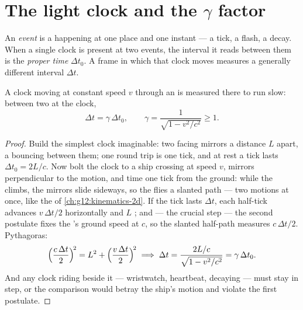 \section{The light clock and the $\gamma$ factor}

\begin{definition}\label{def:g12:special-relativity:proper-time}
An \emph{event} is a happening at one place and one instant
--- a tick, a flash, a decay. When a single clock is present at two events,
the interval it reads between them is the
\emph{proper time} $\Delta t_0$. A frame in which that
clock moves measures a generally different interval $\Delta t$.
\end{definition}

\begin{theorem}\label{thm:g12:special-relativity:dilation}
A clock moving at constant speed $v$ through an  is measured
there to run slow: between two  at the clock,
\[
\Delta t = \gamma\, \Delta t_0, \qquad
\gamma = \frac{1}{\sqrt{1 - v^2/c^2}} \geq 1 .
\]
\end{theorem}

\begin{proof}
Build the simplest clock imaginable: two facing mirrors a distance $L$
apart, a  bouncing between them; one round trip is one tick, and at
rest a tick lasts $\Delta t_0 = 2L/c$. Now bolt the clock to a ship
crossing at speed $v$, mirrors perpendicular to the motion, and time one
tick from the ground: while the  climbs, the mirrors slide sideways,
so the  flies a slanted path --- two motions at once, like the
 of \cref{ch:g12:kinematics-2d}. If the tick lasts $\Delta t$,
each half-tick advances $v\,\Delta t/2$ horizontally and $L$ ; and ---
the crucial step --- the second postulate fixes the 's ground speed at
$c$, so the slanted half-path measures $c\,\Delta t/2$. Pythagoras:
\[
\Bigl(\frac{c\,\Delta t}{2}\Bigr)^{\!2} = L^2 + \Bigl(\frac{v\,\Delta t}{2}\Bigr)^{\!2}
\;\Longrightarrow\;
\Delta t = \frac{2L/c}{\sqrt{1 - v^2/c^2}} = \gamma\,\Delta t_0 .
\]
And any clock riding beside it --- wristwatch, heartbeat, decaying  ---
must stay in step, or the comparison would betray the ship's motion and violate
the first postulate.
\end{proof}

